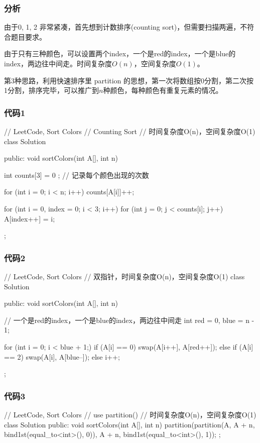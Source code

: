 \subsubsection{分析}
由于0, 1, 2 非常紧凑，首先想到计数排序(counting sort)，但需要扫描两遍，不符合题目要求。

由于只有三种颜色，可以设置两个index，一个是red的index，一个是blue的index，两边往中间走。时间复杂度$O(n)$，空间复杂度$O(1)$。

第3种思路，利用快速排序里 partition 的思想，第一次将数组按0分割，第二次按1分割，排序完毕，可以推广到$n$种颜色，每种颜色有重复元素的情况。


\subsubsection{代码1}
\begin{Code}
// LeetCode, Sort Colors
// Counting Sort
// 时间复杂度O(n)，空间复杂度O(1)
class Solution {
public:
    void sortColors(int A[], int n) {
        int counts[3] = { 0 }; // 记录每个颜色出现的次数

        for (int i = 0; i < n; i++)
            counts[A[i]]++;

        for (int i = 0, index = 0; i < 3; i++)
            for (int j = 0; j < counts[i]; j++)
                A[index++] = i;

    }
};
\end{Code}


\subsubsection{代码2}
\begin{Code}
// LeetCode, Sort Colors
// 双指针，时间复杂度O(n)，空间复杂度O(1)
class Solution {
public:
    void sortColors(int A[], int n) {
        // 一个是red的index，一个是blue的index，两边往中间走
        int red = 0, blue = n - 1;

        for (int i = 0; i < blue + 1;) {
            if (A[i] == 0)
                swap(A[i++], A[red++]);
            else if (A[i] == 2)
                swap(A[i], A[blue--]);
            else
                i++;
        }
    }
};
\end{Code}


\subsubsection{代码3}
\begin{Code}
// LeetCode, Sort Colors
// use partition()
// 时间复杂度O(n)，空间复杂度O(1)
class Solution {
public:
    void sortColors(int A[], int n) {
        partition(partition(A, A + n, bind1st(equal_to<int>(), 0)), A + n,
                bind1st(equal_to<int>(), 1));
    }
};
\end{Code}


